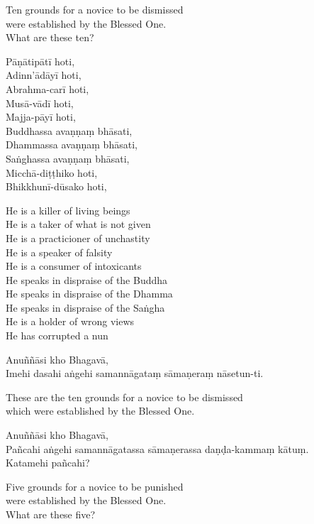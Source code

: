 \begin{english}
  Ten grounds for a novice to be dismissed\\
  were established by the Blessed One.\\
  What are these ten?
\end{english}

Pāṇātipātī hoti,\\
Adinn'ādāyī hoti,\\
Abrahma-carī hoti,\\
Musā-vādī hoti,\\
Majja-pāyī hoti,\\
Buddhassa avaṇṇaṃ bhāsati,\\
Dhammassa avaṇṇaṃ bhāsati,\\
Saṅghassa avaṇṇaṃ bhāsati,\\
Micchā-diṭṭhiko hoti,\\
Bhikkhunī-dūsako hoti,

\begin{english}
  He is a killer of living beings\\
  He is a taker of what is not given\\
  He is a practicioner of unchastity\\
  He is a speaker of falsity\\
  He is a consumer of intoxicants\\
  He speaks in dispraise of the Buddha\\
  He speaks in dispraise of the Dhamma\\
  He speaks in dispraise of the Saṅgha\\
  He is a holder of wrong views\\
  He has corrupted a nun
\end{english}

Anuññāsi kho Bhagavā,\\
Imehi dasahi aṅgehi samannāgataṃ sāmaṇeraṃ nāsetun-ti.

\begin{english}
  These are the ten grounds for a novice to be dismissed\\
  which were established by the Blessed One.
\end{english}

Anuññāsi kho Bhagavā,\\
Pañcahi aṅgehi samannāgatassa sāmaṇerassa daṇḍa-kammaṃ kātuṃ.\\
Katamehi pañcahi?

\begin{english}
  Five grounds for a novice to be punished\\
  were established by the Blessed One.\\
  What are these five?
\end{english}

